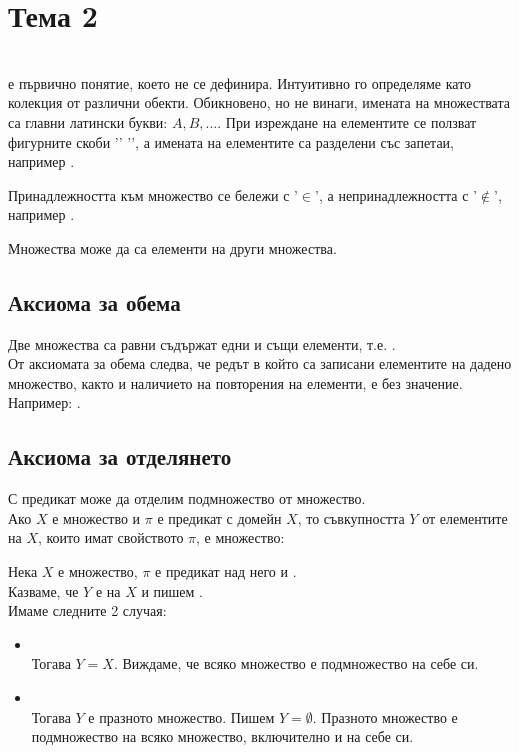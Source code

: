 \section{Тема 2}

 \\
 е първично понятие, което не се дефинира. Интуитивно го определяме като колекция от
различни обекти. Обикновено, но не винаги, имената на множествата са главни латински букви: \(A, B, ...\).
При изреждане на елементите се ползват фигурните скоби '{'  '}', а имената на елементите са разделени със
запетаи, например .

Принадлежността към множество се бележи с '\(\in\)', а непринадлежността с '\(\not \in\)', например
.

Множества може да са елементи на други множества.

\subsection{Аксиома за обема}
Две множества са равни \totw съдържат едни и същи елементи, т.е. 
. \\

От аксиомата за обема следва, че редът в който са записани елементите на дадено множество, както и 
наличието на повторения на елементи, е без значение.
Например: .

\subsection{Аксиома за отделянето}
С предикат може да отделим подмножество от множество. \\

Ако \(X\) е множество и \(\pi\) е предикат с домейн \(X\), то съвкупността \(Y\) от елементите на \(X\), които
имат свойството \(\pi\), е множество: \\

Нека \(X\) е множество, \(\pi\) е предикат над него и . \\
Казваме, че \(Y\) е  на \(X\) и пишем . \\
Имаме следните 2 случая:
\begin{itemize}
    \item {} \\
    Тогава \(Y = X\). Виждаме, че всяко множество е подмножество на себе си.
    \item {} \\
    Тогава \(Y\) е празното множество. Пишем \(Y = \emptyset\). Празното множество е подмножество на всяко
    множество, включително и на себе си.
\end{itemize}

